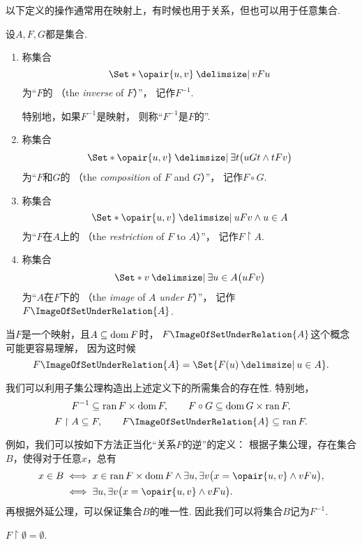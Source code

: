 以下定义的操作通常用在映射上，有时候也用于关系，但也可以用于任意集合.
\begin{definition}
设\(A,F,G\)都是集合.
\begin{enumerate}
	\item 称集合\[
		\Set*{ \opair{u,v} \given v F u }
	\]为“\(F\)的%
	（the \emph{inverse} of \(F\)）”，
	记作\(F^{-1}\).

	特别地，如果\(F^{-1}\)是映射，
	则称“\(F^{-1}\)是\(F\)的”.

	\item 称集合\[
		\Set*{ \opair{u,v} \given \exists t \bigl( u G t \land t F v \bigr) }
	\]为“\(F\)和\(G\)的%
	（the \emph{composition} of \(F\) and \(G\)）”，
	记作\(F \circ G\).

	\item 称集合\[
		\Set*{ \opair{u,v} \given u F v \land u \in A }
	\]为“\(F\)在\(A\)上的%
	（the \emph{restriction} of \(F\) to \(A\)）”，
	记作\(F \upharpoonright A\).

	\item 称集合\[
		\Set*{ v \given \exists u \in A \bigl( u F v \bigr) }
	\]为“\(A\)在\(F\)下的%
	（the \emph{image} of \(A\) \emph{under} \(F\)）”，
	记作\(F\ImageOfSetUnderRelation{A}\).
\end{enumerate}
\end{definition}

当\(F\)是一个映射，且\(A \subseteq \operatorname{dom} F\)时，
\(F\ImageOfSetUnderRelation{A}\)这个概念可能更容易理解，
因为这时候\[
	F\ImageOfSetUnderRelation{A}
	= \Set{ F(u) \given u \in A }.
\]

我们可以利用子集公理构造出上述定义下的所需集合的存在性.
特别地，\[
	F^{-1} \subseteq \operatorname{ran} F \times \operatorname{dom} F, \qquad
	F \circ G \subseteq \operatorname{dom} G \times \operatorname{ran} F,
\]\[
	F \upharpoonright A \subseteq F, \qquad
	F\ImageOfSetUnderRelation{A} \subseteq \ran F.
\]

例如，我们可以按如下方法正当化“关系\(F\)的逆”的定义：
根据子集公理，存在集合\(B\)，使得对于任意\(x\)，总有\begin{align*}
	x \in B
	&\iff
	x \in \ran F \times \dom F
	\land
	\exists u, \exists v \bigl( x = \opair{u,v} \land v F u \bigr), \\
	&\iff
	\exists u, \exists v \bigl( x = \opair{u,v} \land v F u \bigr).
\end{align*}
再根据外延公理，可以保证集合\(B\)的唯一性.
因此我们可以将集合\(B\)记为\(F^{-1}\).

\begin{theorem}
\(F \upharpoonright \emptyset = \emptyset\).
\end{theorem}

